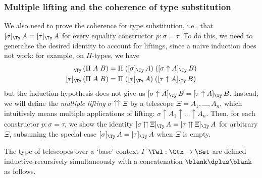 \documentclass[a4paper,UKenglish,numberwithinsect,cleveref,thm-restate]{lipics-v2021}
\begin{document}
\subsubsection{Multiple lifting and the coherence of type substitution}

We also need to prove the coherence for type substitution, i.e., that $[\sigma]_{\Ty}\,A = [\tau]_{\Ty}\,A$ for every equality constructor $p : \sigma = \tau$.
To do this, we need to generalise the desired identity to account for liftings, since a naive induction does not work: for example, on $\Pi$-types, we have
\begin{align*}
  [\sigma]_{\Ty}\,(\Pi\;A\;B) & = \Pi\;([\sigma]_{\Ty}\,A)\;([\sigma\uparrow A]_{\Ty}\,B) \\
  [\tau]_{\Ty}\,(\Pi\;A\;B) & = \Pi\;([\tau]_{\Ty}\,A)\;([\tau\uparrow A]_{\Ty}\,B)
\end{align*}
but the induction hypothesis does not give us $[\sigma\uparrow A]_{\Ty}\,B = [\tau\uparrow A]_{\Ty}\,B$.
Instead, we will define the \emph{multiple lifting} $\sigma \upuparrows \Xi$ by a telescope $\Xi = A_1, \dots, A_n$, which intuitively means multiple applications of lifting: $\sigma \uparrow A_1 \uparrow \dots \uparrow A_n$.
Then, for each constructor $p : \sigma = \tau$, we show the identity
$[\sigma \mathop{\upuparrows} \Xi ]_{\Ty}\,A = [\tau \mathop{\upuparrows} \Xi ]_{\Ty}\,A$
for arbitrary $\Xi$, subsuming the special case $[\sigma ]_{\Ty}\,A = [\tau ]_{\Ty}\,A$ when $\Xi$ is empty.

The type of telescopes over a `base' context $\Gamma$ $\Tel : \Ctx \to \Set$ are defined inductive-recursively simultaneously with a concatenation $\blank \dplus \blank$ as follows.
\end{document}
